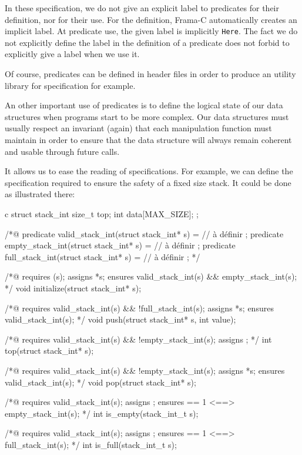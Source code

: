 \documentclass[middle]{zmdocument}
\begin{document}
In these specification, we do not give an explicit label to predicates
for their definition, nor for their use. For the definition, Frama-C
automatically creates an implicit label. At predicate use, the given
label is implicitly \texttt{Here}. The fact we do not explicitly define
the label in the definition of a predicate does not forbid to explicitly
give a label when we use it.

Of course, predicates can be defined in header files in order to produce
an utility library for specification for example.




An other important use of predicates is to define the logical state of
our data structures when programs start to be more complex. Our data
structures must usually respect an invariant (again) that each
manipulation function must maintain in order to ensure that the data
structure will always remain coherent and usable through future calls.



It allows us to ease the reading of specifications. For example, we can
define the specification required to ensure the safety of a fixed size
stack. It could be done as illustrated there:



\begin{CodeBlock}{c}
struct stack_int{
  size_t top;
  int    data[MAX_SIZE];
};

/*@
  predicate valid_stack_int(struct stack_int* s) = // à définir ;
  predicate empty_stack_int(struct stack_int* s) = // à définir ;
  predicate full_stack_int(struct stack_int* s) =  // à définir ;
*/

/*@
  requires \valid(s);
  assigns *s;
  ensures valid_stack_int(s) && empty_stack_int(s);
*/
void initialize(struct stack_int* s);

/*@
  requires valid_stack_int(s) && !full_stack_int(s);
  assigns  *s;
  ensures valid_stack_int(s);
*/
void push(struct stack_int* s, int value);

/*@
  requires valid_stack_int(s) && !empty_stack_int(s);
  assigns \nothing;
*/
int  top(struct stack_int* s);

/*@
  requires valid_stack_int(s) && !empty_stack_int(s);
  assigns *s;
  ensures valid_stack_int(s);
*/
void pop(struct stack_int* s);

/*@
  requires valid_stack_int(s);
  assigns \nothing;
  ensures \result == 1 <==> empty_stack_int(s);
*/
int  is_empty(stack_int_t s);


/*@
  requires valid_stack_int(s);
  assigns \nothing;
  ensures \result == 1 <==> full_stack_int(s);
*/
int  is_full(stack_int_t s);
\end{CodeBlock}
\end{document}
